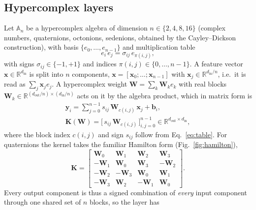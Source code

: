\subsection{Hypercomplex layers}
\label{sec:hyper}
Let $\mathbb{A}_n$ be a hypercomplex algebra of dimension $n\in\{2,4,8,16\}$ (complex numbers,
quaternions, octonions, sedenions, obtained by the Cayley--Dickson construction), with basis
$\{e_0,\dots,e_{n-1}\}$ and multiplication table
\begin{equation}
  e_i\,e_j = \sigma_{ij}\, e_{\pi(i,j)},
  \label{eq:table}
\end{equation}
with signs $\sigma_{ij}\in\{-1,+1\}$ and indices $\pi(i,j)\in\{0,\dots,n-1\}$.
A feature vector $\mathbf{x}\in\mathbb{R}^{d_{\mathrm{in}}}$ is split into $n$ components,
$\mathbf{x}=[\mathbf{x}_0;\dots;\mathbf{x}_{n-1}]$ with $\mathbf{x}_j\in\mathbb{R}^{d_{\mathrm{in}}/n}$,
i.e.\ it is read as $\sum_j \mathbf{x}_j e_j$. A hypercomplex weight
$\mathbf{W}=\sum_{k}\mathbf{W}_k e_k$ with real blocks $\mathbf{W}_k\in\mathbb{R}^{(d_{\mathrm{out}}/n)\times(d_{\mathrm{in}}/n)}$
acts on it by the algebra product, which in matrix form is
\begin{equation}
\begin{gathered}
  \mathbf{y}_i = \sum_{j=0}^{n-1} s_{ij}\,\mathbf{W}_{c(i,j)}\,\mathbf{x}_j + \mathbf{b}_i,\\
  \mathbf{K}(\mathbf{W}) = \big[\, s_{ij}\,\mathbf{W}_{c(i,j)} \,\big]_{i,j=0}^{n-1}\in\mathbb{R}^{d_{\mathrm{out}}\times d_{\mathrm{in}}},
\end{gathered}
  \label{eq:hlinear}
\end{equation}
where the block index $c(i,j)$ and sign $s_{ij}$ follow from Eq.~\eqref{eq:table}. For quaternions the
kernel takes the familiar Hamilton form (Fig.~\ref{fig:hamilton}),
\begin{equation}
  \mathbf{K} = \begin{bmatrix}
   \mathbf{W}_0 & \mathbf{W}_1 & \mathbf{W}_2 & \mathbf{W}_3\\
  -\mathbf{W}_1 & \mathbf{W}_0 & \mathbf{W}_3 & -\mathbf{W}_2\\
  -\mathbf{W}_2 & -\mathbf{W}_3 & \mathbf{W}_0 & \mathbf{W}_1\\
  -\mathbf{W}_3 & \mathbf{W}_2 & -\mathbf{W}_1 & \mathbf{W}_0
  \end{bmatrix}.
  \label{eq:hamilton}
\end{equation}
Every output component is thus a signed combination of \emph{every} input component through one
shared set of $n$ blocks, so the layer has

